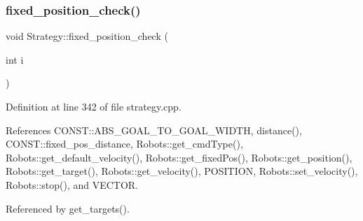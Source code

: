 \subsubsection{\texorpdfstring{fixed\+\_\+position\+\_\+check()}{fixed\_position\_check()}}
{\footnotesize\ttfamily void Strategy\+::fixed\+\_\+position\+\_\+check (\begin{DoxyParamCaption}\item[{int}]{i }\end{DoxyParamCaption})}



Definition at line 342 of file strategy.\+cpp.



References C\+O\+N\+S\+T\+::\+A\+B\+S\+\_\+\+G\+O\+A\+L\+\_\+\+T\+O\+\_\+\+G\+O\+A\+L\+\_\+\+W\+I\+D\+TH, distance(), C\+O\+N\+S\+T\+::fixed\+\_\+pos\+\_\+distance, Robots\+::get\+\_\+cmd\+Type(), Robots\+::get\+\_\+default\+\_\+velocity(), Robots\+::get\+\_\+fixed\+Pos(), Robots\+::get\+\_\+position(), Robots\+::get\+\_\+target(), Robots\+::get\+\_\+velocity(), P\+O\+S\+I\+T\+I\+ON, Robots\+::set\+\_\+velocity(), Robots\+::stop(), and V\+E\+C\+T\+OR.



Referenced by get\+\_\+targets().


